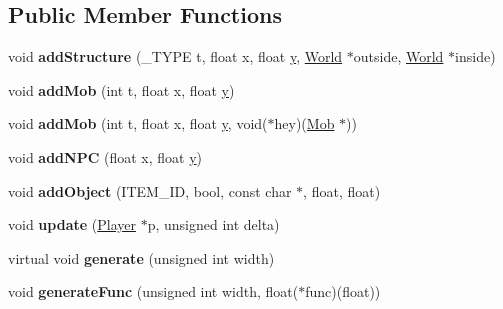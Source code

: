 \subsection*{Public Member Functions}
\begin{DoxyCompactItemize}
\item 
\hypertarget{classWorld_aa02f54d5e38bf0e4c67b210ba4e27761}{}void {\bfseries add\+Structure} (\+\_\+\+T\+Y\+P\+E t, float x, float \hyperlink{world_8h_aa4f0d3eebc3c443f9be81bf48561a217}{y}, \hyperlink{classWorld}{World} $\ast$outside, \hyperlink{classWorld}{World} $\ast$inside)\label{classWorld_aa02f54d5e38bf0e4c67b210ba4e27761}

\item 
\hypertarget{classWorld_a631df20b433c01a9f9a215fd6dba0663}{}void {\bfseries add\+Mob} (int t, float x, float \hyperlink{world_8h_aa4f0d3eebc3c443f9be81bf48561a217}{y})\label{classWorld_a631df20b433c01a9f9a215fd6dba0663}

\item 
\hypertarget{classWorld_a52f1073c5ff06ff1a9290fb46037ba17}{}void {\bfseries add\+Mob} (int t, float x, float \hyperlink{world_8h_aa4f0d3eebc3c443f9be81bf48561a217}{y}, void($\ast$hey)(\hyperlink{classMob}{Mob} $\ast$))\label{classWorld_a52f1073c5ff06ff1a9290fb46037ba17}

\item 
\hypertarget{classWorld_a47b64d285af2fa0ab3e3b5e25b838be1}{}void {\bfseries add\+N\+P\+C} (float x, float \hyperlink{world_8h_aa4f0d3eebc3c443f9be81bf48561a217}{y})\label{classWorld_a47b64d285af2fa0ab3e3b5e25b838be1}

\item 
\hypertarget{classWorld_a38a1489059711bc5173b4e45c9424ac2}{}void {\bfseries add\+Object} (I\+T\+E\+M\+\_\+\+I\+D, bool, const char $\ast$, float, float)\label{classWorld_a38a1489059711bc5173b4e45c9424ac2}

\item 
\hypertarget{classWorld_a8920a4df8c88a4e3c2718253e0ce0a9d}{}void {\bfseries update} (\hyperlink{classPlayer}{Player} $\ast$p, unsigned int delta)\label{classWorld_a8920a4df8c88a4e3c2718253e0ce0a9d}

\item 
\hypertarget{classWorld_a21279facd50bb40e28868fe20133392c}{}virtual void {\bfseries generate} (unsigned int width)\label{classWorld_a21279facd50bb40e28868fe20133392c}

\item 
\hypertarget{classWorld_a52f34574219e97541783d8949ccfad63}{}void {\bfseries generate\+Func} (unsigned int width, float($\ast$func)(float))\label{classWorld_a52f34574219e97541783d8949ccfad63}


\end{DoxyCompactItemize}
